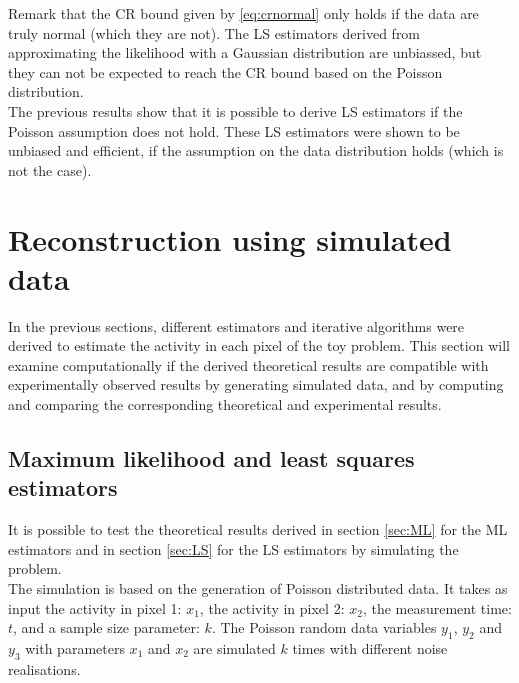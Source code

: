 \documentclass[report,12pt]{report}
\begin{document}
Remark that the CR bound given by \ref{eq:crnormal} only holds if the data are truly normal (which they are not). The LS estimators derived from approximating the likelihood with a Gaussian distribution are unbiassed, but they can not be expected to reach the CR bound based on the Poisson distribution.\\
 
The previous results show that it is possible to derive LS estimators if the Poisson assumption does not hold. These LS estimators were shown to be unbiased and efficient, if the assumption on the data distribution holds (which is not the case).




\section{Reconstruction using simulated data}
In the previous sections, different estimators and iterative algorithms were derived to estimate the activity in each pixel of the toy problem. This section will examine computationally if the derived theoretical results are compatible with experimentally observed results by generating simulated data, and by computing and comparing the corresponding theoretical and experimental results.

\subsection{Maximum likelihood and least squares estimators}
It is possible to test the theoretical results derived in section \ref{sec:ML} for the ML estimators and in section \ref{sec:LS} for the LS estimators by simulating the problem.\\

The simulation is based on the generation of Poisson distributed data. It takes as input the activity in pixel 1: $x_1$, the activity in pixel 2: $x_2$, the measurement time: $t$, and a sample size parameter: $k$. The Poisson random data variables $y_1$, $y_2$ and $y_3$ with parameters $x_1$ and $x_2$ are simulated $k$ times with different noise realisations.
\end{document}
